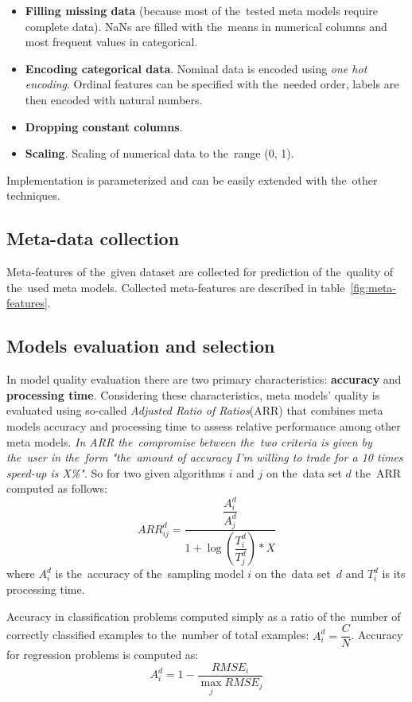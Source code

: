 \documentclass[hidelinks, english]{mvi-report}
\begin{document}
\begin{itemize}
    \item \textbf{Filling missing data} (because most of the~tested meta models require complete data). NaNs are filled with
    the~means in numerical columns and most frequent values in categorical.
    \item \textbf{Encoding categorical data}. Nominal data is encoded using \textit{one hot encoding}. Ordinal features
    can be specified with the~needed order, labels are then encoded with natural numbers.
    \item \textbf{Dropping constant columns}.
    \item \textbf{Scaling}. Scaling of numerical data to the~range (0, 1).
\end{itemize}

Implementation is parameterized and can be easily extended with the~other techniques.

\subsection{Meta-data collection}

Meta-features of the~given dataset are collected for prediction of the~quality of the~used meta models. Collected
meta-features are described in table~\ref{fig:meta-features}.


\subsection{Models evaluation and selection}
In model quality evaluation there are two primary characteristics: \textbf{accuracy} and \textbf{processing time}.
Considering these characteristics, meta models' quality is evaluated using so-called \textit{Adjusted Ratio of Ratios}(ARR)
that combines meta models accuracy and processing time to assess relative performance among other meta models. \textit{In ARR
the~compromise between the~two criteria is given by the~user in the~form "the~amount of accuracy I'm willing to trade for
a 10 times speed-up is X\%"}\cite{sampling-based-relative-landmarks}. So for two given algorithms $i$ and $j$ on
the~data set $d$ the~ARR computed as follows:
\[ ARR^d_{ij} = \dfrac{\dfrac{A^d_i}{A^d_j}}{1+\log{(\dfrac{T^d_i}{T^d_j})}*X} \]
where $A^d_i$ is the~accuracy of the~sampling model $i$ on the~data set~$d$ and $T^d_i$ is its processing time.

Accuracy in classification problems computed simply as a ratio of the~number of correctly classified examples to
the~number of total examples: $ A^d_i = \dfrac{C}{N} $. Accuracy for regression problems is computed as:
\[ A^d_i = 1 - \dfrac{RMSE_i}{\max_{j}RMSE_j} \]
\end{document}
